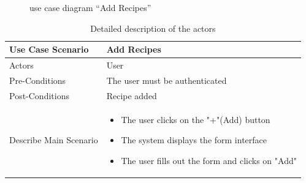 \documentclass{article}
\begin{document}
{{\begin{figure}[htbp]
    \caption{use case diagram “Add Recipes”}
    \label{fig:design2}
\end{figure}
\begin{table}[h]
    \centering
    \begin{tabularx}{\textwidth}{X|X}
        \toprule
        Use Case Scenario & Add Recipes \\
        \midrule
        Actors & User \\
        \midrule
        Pre-Conditions & The user must be authenticated \\
        \midrule
        Post-Conditions & Recipe added  \\
        \midrule
        Describe Main Scenario &  \begin{itemize}[label=$\bullet$]
            \item The user clicks on the "+"(Add) button
            \item The system displays the form interface
            \item The user fills out the form and clicks on "Add"
        \end{itemize} \\
        \bottomrule
    \end{tabularx}
    \caption{Detailed description of the actors}
    \label{tab:actors_roles}
\end{table}

}}
\end{document}
